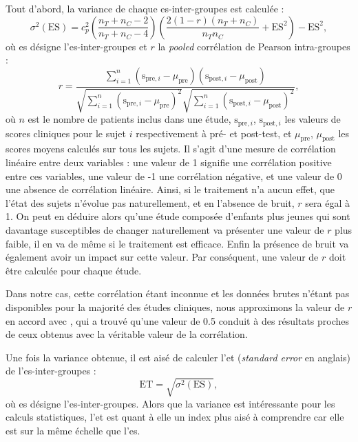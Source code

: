 Tout d'abord, la variance de chaque \gls{es}-inter-groupes est calculée \citep{Morris2008}:
\begin{equation}
\label{eq:metareview_variance_effect_size_between}
\sigma^2(\text{ES}) = c_p^2 \left(
    \frac{n_T + n_C - 2} {n_T + n_C - 4} 
\right ) \left ( 
		\frac{2(1-r)(n_T + n_C)} {n_Tn_C} + \text{ES}^2 
\right) - \text{ES}^2,
\end{equation}
où \gls{es} désigne l'\gls{es}-inter-groupes et $r$ la \textit{pooled} corrélation de Pearson intra-groupes \citep{James2013} :
\begin{equation}
\label{eq:metareview_within_group_pearson_correlation}
r = \frac{ \sum_{i=1}^{n} (\text{s}_{\text{pre},i} - \mu_{\text{pre}})(\text{s}_{\text{post},i} - \mu_{\text{post}}) } { \sqrt{ \sum_{i=1}^{n} (\text{s}_{\text{pre},i} - 
\mu_{\text{pre}})^2} \sqrt{\sum_{i=1}^{n} (\text{s}_{\text{post},i} - \mu_{\text{post}})^2} }, 
\end{equation}
où $n$ est le nombre de patients inclus dans une étude, $\text{s}_{\text{pre},i}$, $\text{s}_{\text{post},i}$ les valeurs de scores cliniques pour le sujet $i$ 
respectivement à pré- et post-test, et $\mu_{\text{pre}}$, $\mu_{\text{post}}$ les scores moyens calculés sur tous les sujets. 
Il s'agit d'une mesure de corrélation linéaire entre deux variables : une valeur de 1 signifie une corrélation positive entre ces variables,
une valeur de -1 une corrélation négative, et une valeur de 0 une absence de corrélation linéaire. Ainsi, si le traitement n'a aucun effet, 
que l'état des sujets n'évolue pas naturellement, et en l'absence de bruit, $r$ sera égal à 1. On peut en déduire alors qu'une étude 
composée d'enfants plus jeunes qui sont davantage susceptibles de changer naturellement va présenter une valeur de $r$ plus faible, il en va 
de même si le traitement est efficace. Enfin la présence de bruit va également avoir un impact sur cette valeur. Par conséquent, une valeur 
de $r$ doit être calculée pour chaque étude.

Dans notre cas, cette corrélation étant inconnue et les données brutes n'étant pas disponibles pour la majorité des études cliniques, nous approximons la valeur 
de $r$ en accord avec \citet{Balk2012}, qui a trouvé qu'une valeur de 0.5 conduit à des résultats proches de ceux obtenus avec la véritable
valeur de la corrélation.

Une fois la variance obtenue, il est aisé de calculer l'\gls{et} (\textit{standard error} en anglais) de l'\gls{es}-inter-groupes \citep{Borenstein2009} :
\begin{equation}
\label{eq:metareview_standard_error_effect_size_between}
\text{ET} = \sqrt{\sigma^2(\text{ES})},
\end{equation}
où \gls{es} désigne l'\gls{es}-inter-groupes. Alors que la variance est intéressante pour les calculs statistiques, l'\gls{et} est quant à elle 
un index plus aisé à comprendre car elle est sur la même échelle que l'\gls{es}.

